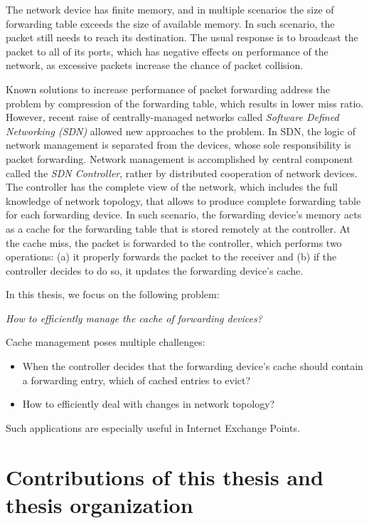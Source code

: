 The network device has finite memory, and in multiple scenarios the size of forwarding table exceeds the size of available memory.
In such scenario, the packet still needs to reach its destination.
The usual response is to broadcast the packet to all of its ports, which has negative effects on performance of the network, as excessive packets increase the chance of packet collision.

Known solutions to increase performance of packet forwarding address the problem by compression of the forwarding table, which results in lower miss ratio.
However, recent raise of centrally-managed networks called \emph{Software Defined Networking (SDN)} allowed new approaches to the problem.
In SDN, the logic of network management is separated from the devices, whose sole responsibility is packet forwarding.
Network management is accomplished by central component called the \emph{SDN Controller}, rather by distributed cooperation of network devices.
The controller has the complete view of the network, which includes the full knowledge of network topology, that allows to produce complete forwarding table for each forwarding device.
In such scenario, the forwarding device's memory acts as a cache for the forwarding table that is stored remotely at the controller.
At the cache miss, the packet is forwarded to the controller, which performs two operations: (a) it properly forwards the packet to the receiver and (b) if the controller decides to do so, it updates the forwarding device's cache.

In this thesis, we focus on the following problem:
\begin{center}
  \emph{How to efficiently manage the cache of forwarding devices?}
\end{center}

Cache management poses multiple challenges:
\begin{itemize}
  \item When the controller decides that the forwarding device's cache should contain a forwarding entry, which of cached entries to evict?
  \item How to efficiently deal with changes in network topology?
\end{itemize}

Such applications are especially useful in Internet Exchange Points.

\section{Contributions of this thesis and thesis organization}

